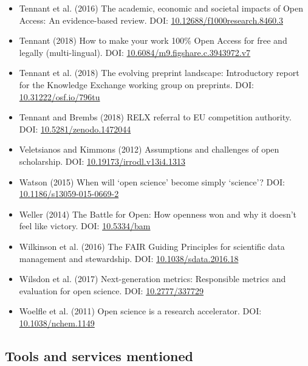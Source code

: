 \begin{itemize}
\item
  Tennant et al. (2016) The academic, economic and societal impacts of
  Open Access: An evidence-based review. DOI:
  \href{https://doi.org/10.12688/f1000research.8460.3}{10.12688/f1000research.8460.3}
\item
  Tennant (2018) How to make your work 100\% Open Access for free and
  legally (multi-lingual). DOI:
  \href{https://doi.org/10.6084/m9.figshare.c.3943972.v7}{10.6084/m9.figshare.c.3943972.v7}
\item
  Tennant et al. (2018) The evolving preprint landscape: Introductory
  report for the Knowledge Exchange working group on preprints. DOI:
  \href{https://doi.org/10.31222/osf.io/796tu}{10.31222/osf.io/796tu}
\item
  Tennant and Brembs (2018) RELX referral to EU competition authority.
  DOI:
  \href{https://doi.org/10.5281/zenodo.1472044}{10.5281/zenodo.1472044}
\item
  Veletsianos and Kimmons (2012) Assumptions and challenges of open
  scholarship. DOI:
  \href{https://doi.org/10.19173/irrodl.v13i4.1313}{10.19173/irrodl.v13i4.1313}
\item
  Watson (2015) When will `open science' become simply `science'? DOI:
  \href{https://doi.org/10.1186/s13059-015-0669-2}{10.1186/s13059-015-0669-2}
\item
  Weller (2014) The Battle for Open: How openness won and why it doesn't
  feel like victory. DOI:
  \href{https://doi.org/10.5334/bam}{10.5334/bam}
\item
  Wilkinson et al. (2016) The FAIR Guiding Principles for scientific
  data management and stewardship. DOI:
  \href{https://doi.org/10.1038/sdata.2016.18}{10.1038/sdata.2016.18}
\item
  Wilsdon et al. (2017) Next-generation metrics: Responsible metrics and
  evaluation for open science. DOI:
  \href{https://doi.org/10.2777/337729}{10.2777/337729}
\item
  Woelfle et al. (2011) Open science is a research accelerator. DOI:
  \href{https://doi.org/10.1038/nchem.1149}{10.1038/nchem.1149}
\end{itemize}

\subsection{Tools and services
mentioned}\label{tools-and-services-mentioned}

